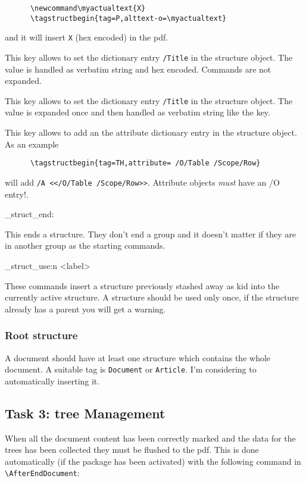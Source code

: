 \documentclass[DIV=12,parskip=half-,bibliography=totoc]{scrartcl}
\begin{document}
\begin{description}
      \begin{lstlisting}
      \newcommand\myactualtext{X}
      \tagstructbegin{tag=P,alttext-o=\myactualtext}
      \end{lstlisting}

      and it will insert \verb+X+ (hex encoded)  in the pdf.
  \item[\PrintKeyName{title}] This key allows to set the dictionary entry \texttt{/Title} in the structure object.
      The value is handled as verbatim string and hex encoded. Commands are not expanded.
  \item[\PrintKeyName{title-o}] This key allows to set the dictionary entry \texttt{/Title} in the structure object.
      The value is expanded once and then handled as verbatim string like the  key.
  \item[\PrintKeyName{attribute}] This key allows to add an the attribute dictionary entry in the structure object. As an example 
      \begin{lstlisting}
      \tagstructbegin{tag=TH,attribute= /O/Table /Scope/Row}
      \end{lstlisting}
      
      will add \verb+/A <</O/Table /Scope/Row>>+. Attribute objects \emph{must} have an /O entry!.
       \end{description}


\ExplSyntaxOn
\DescribeMacro\tagstructend
\DescribeMacro\uftag_struct_end:
\ExplSyntaxOff

This ends a structure. They don't end a group and it doesn't matter if they are in another group as the starting commands.

\ExplSyntaxOn
\DescribeMacro{}
\DescribeMacro\uftag_struct_use:n {<label>}
\ExplSyntaxOff

These commands insert a structure previously stashed away as kid into the currently active structure. A structure should be used only once, if the structure already has a parent you will get a warning.

\subsubsection{Root structure}

A document should have at least one structure which contains the whole document. A suitable tag is \texttt{Document} or \texttt{Article}. I'm considering to automatically inserting it.


\subsection{Task 3: tree Management}
When all the document content has been correctly marked and the data for the trees has been collected they must be flushed to the pdf. This is done automatically (if the package has been activated) with the following command in \verb+\AfterEndDocument+:
\end{document}
